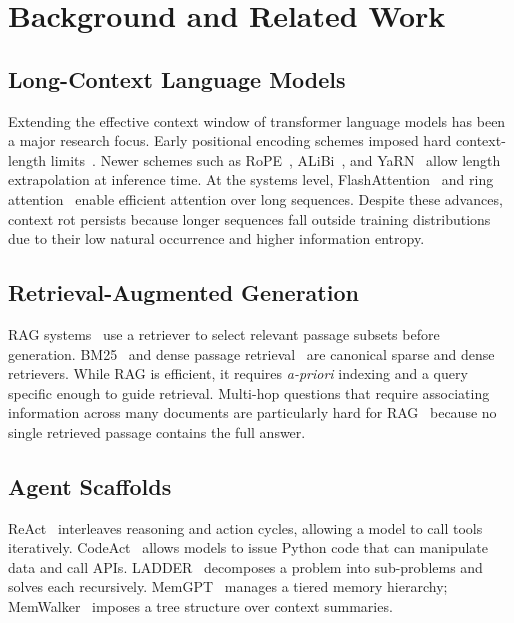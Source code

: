 \documentclass[journal, 10pt, letterpaper]{IEEEtran}
\begin{document}
\section{Background and Related Work}
\label{sec:related}

\subsection{Long-Context Language Models}

Extending the effective context window of transformer language models has been
a major research focus.  Early positional encoding schemes imposed hard
context-length limits~\cite{vaswani2017attention}.  Newer schemes such as
RoPE~\cite{su2021roformer}, ALiBi~\cite{press2022alibi}, and
YaRN~\cite{peng2023yarn} allow length extrapolation at inference time.  At
the systems level, FlashAttention~\cite{dao2022flashattention} and ring
attention~\cite{liu2024ring} enable efficient attention over long sequences.
Despite these advances, context rot persists because longer sequences fall
outside training distributions due to their low natural occurrence and higher
information entropy.

\subsection{Retrieval-Augmented Generation}

RAG systems~\cite{lewis2020rag} use a retriever to select relevant passage
subsets before generation.  BM25~\cite{robertson2009bm25} and dense passage
retrieval~\cite{karpukhin2020dpr} are canonical sparse and dense retrievers.
While RAG is efficient, it requires \emph{a-priori} indexing and a query
specific enough to guide retrieval.  Multi-hop questions that require
associating information across many documents are particularly hard for
RAG~\cite{yang2018hotpotqa} because no single retrieved passage contains the
full answer.

\subsection{Agent Scaffolds}

ReAct~\cite{yao2023react} interleaves reasoning and action cycles, allowing a
model to call tools iteratively.  CodeAct~\cite{wang2024codeact} allows models
to issue Python code that can manipulate data and call APIs.
LADDER~\cite{levy2025ladder} decomposes a problem into sub-problems and solves
each recursively.  MemGPT~\cite{packer2023memgpt} manages a tiered memory
hierarchy; MemWalker~\cite{chen2023memwalker} imposes a tree structure over
context summaries.
\end{document}
